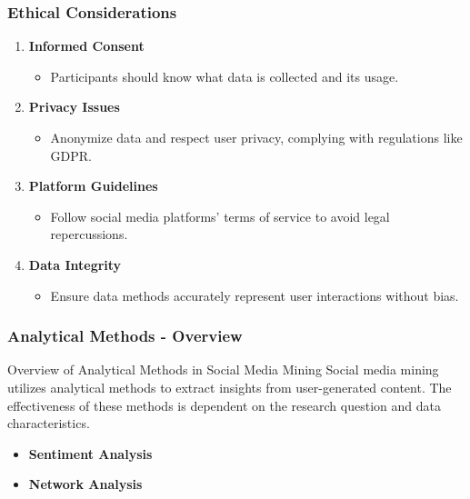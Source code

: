 \documentclass{beamer}
\begin{document}
\begin{frame}[fragile]
    \frametitle{Ethical Considerations}
    \begin{enumerate}
        \item \textbf{Informed Consent}
            \begin{itemize}
                \item Participants should know what data is collected and its usage.
            \end{itemize}
        \item \textbf{Privacy Issues}
            \begin{itemize}
                \item Anonymize data and respect user privacy, complying with regulations like GDPR.
            \end{itemize}
        \item \textbf{Platform Guidelines}
            \begin{itemize}
                \item Follow social media platforms' terms of service to avoid legal repercussions.
            \end{itemize}
        \item \textbf{Data Integrity}
            \begin{itemize}
                \item Ensure data methods accurately represent user interactions without bias.
            \end{itemize}
    \end{enumerate}
\end{frame}

\begin{frame}[fragile]
    \frametitle{Analytical Methods - Overview}
    \begin{block}{Overview of Analytical Methods in Social Media Mining}
        Social media mining utilizes analytical methods to extract insights from user-generated content. The effectiveness of these methods is dependent on the research question and data characteristics.
    \end{block}
    \begin{itemize}
        \item \textbf{Sentiment Analysis}
        \item \textbf{Network Analysis}
    \end{itemize}
\end{frame}
\end{document}
